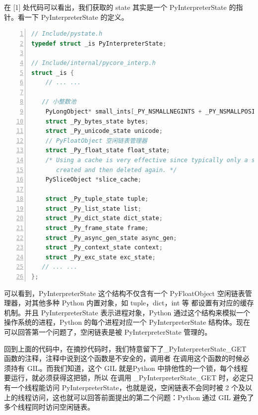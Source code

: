 在 [1] 处代码可以看出，我们获取的 state 其实是一个 PyInterpreterState 的指针。看一下 PyInterpreterState 的定义。

\begin{lstlisting}[language=C, numbers=left, numbersep=1em, numberstyle=\footnotesize , breaklines=true]
// Include/pystate.h
typedef struct _is PyInterpreterState;

// Include/internal/pycore_interp.h
struct _is {
	// ... ...
	
   // 小整数池
    PyLongObject* small_ints[_PY_NSMALLNEGINTS + _PY_NSMALLPOSINTS];
    struct _Py_bytes_state bytes;
    struct _Py_unicode_state unicode;
    // PyFloatObject 空闲链表管理器
    struct _Py_float_state float_state;
    /* Using a cache is very effective since typically only a single slice is
       created and then deleted again. */
    PySliceObject *slice_cache;

    struct _Py_tuple_state tuple;
    struct _Py_list_state list;
    struct _Py_dict_state dict_state;
    struct _Py_frame_state frame;
    struct _Py_async_gen_state async_gen;
    struct _Py_context_state context;
    struct _Py_exc_state exc_state;
   // ... ...
};
\end{lstlisting}

可以看到，PyInterpreterState 这个结构不仅含有一个 PyFloatObject 空闲链表管理器，对其他多种 Python 内置对象，如 tuple，dict，int 等
都设置有对应的缓存机制。并且 PyInterpreterState 表示进程对象，Python 通过这个结构来模拟一个操作系统的进程，Python 的每个进程对应一个 PyInterpreterState 结构体。现在可以回答第一个问题了，空闲链表是被 PyInterpreterState 管理的。

回到上面的代码中，在摘抄代码时，我们特意留下了\_PyInterpreterState\_GET 函数的注释，注释中说到这个函数是不安全的，调用者
在调用这个函数的时候必须持有 GIL。而我们知道，这个 GIL 就是Python 中排他性的一个锁，每个线程要运行，就必须获得这把锁，所以
在调用 \_PyInterpreterState\_GET 时，必定只有一个线程能访问 PyInterpreterState，也就是说，空闲链表不会同时被 2 个及以上的线程访问，这也就可以回答前面提出的第二个问题：Python 通过 GIL 避免了多个线程同时访问空闲链表。

